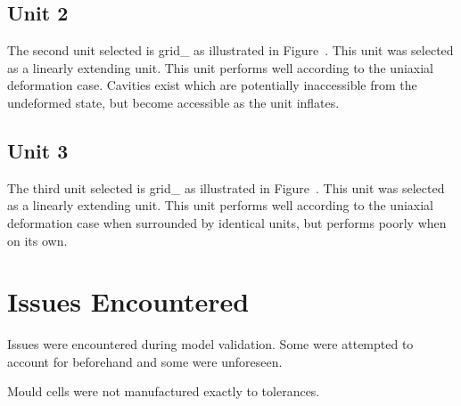 \subsection{Unit 2}

The second unit selected is grid\_ as illustrated in Figure~. This unit was selected as a linearly extending unit. This unit performs well according to the uniaxial deformation case. Cavities exist which are potentially inaccessible from the undeformed state, but become accessible as the unit inflates.

\subsection{Unit 3}

The third unit selected is grid\_ as illustrated in Figure~. This unit was selected as a linearly extending unit. This unit performs well according to the uniaxial deformation case when surrounded by identical units, but performs poorly when on its own.

\section{Issues Encountered}

Issues were encountered during model validation. Some were attempted to account for beforehand and some were unforeseen.

Mould cells were not manufactured exactly to tolerances.